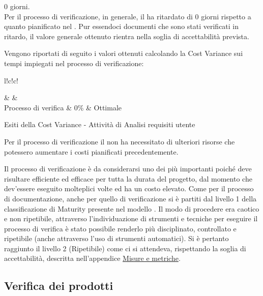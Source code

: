 \documentclass[a4paper, titlepage]{article}
\begin{document}
\begin{description}
\item{} 0 giorni.
\\Per il processo di verificazione, in generale, il  ha ritardato di 0 giorni rispetto a quanto pianificato nel . Pur essendoci documenti che sono stati verificati in ritardo, il valore generale ottenuto rientra nella soglia di accettabilità prevista.
\end{description}
\newpage
{}
Vengono riportati di seguito i valori ottenuti calcolando la Cost Variance sui tempi impiegati nel processo di verificazione:
\begin{tabella}{l!{\VRule}c!{\VRule}c!{\VRule}}
	
	\color{white}  & \color{white}  &\color{white}  \\
	\endfirsthead
	Processo di verifica & 0\% & Ottimale\\
	\caption{Esiti della Cost Variance - Attività di Analisi requisiti utente}	  
\end{tabella}

 Per il processo di verificazione il  non ha necessitato di ulteriori risorse che potessero aumentare i costi pianificati precedentemente.

Il processo di verificazione è da considerarsi uno dei più importanti poiché deve risultare efficiente ed efficace per tutta la durata del progetto, dal momento che dev'essere eseguito molteplici volte ed ha un costo elevato.
\newline Come per il processo di documentazione, anche per quello di verificazione si è partiti dal livello 1 della classificazione di Maturity presente nel modello . Il modo di procedere era caotico e non ripetibile, attraverso l'individuazione di strumenti e tecniche per eseguire il processo di verifica è stato possibile renderlo più disciplinato, controllato e ripetibile (anche attraverso l'uso di strumenti automatici).
\newline Si è pertanto raggiunto il livello 2 (Ripetibile) come ci si attendeva, rispettando la soglia di accettabilità, descritta nell'appendice \hyperref[sec:metr]{Misure e metriche}.

\subsection{Verifica dei prodotti}
\end{document}
